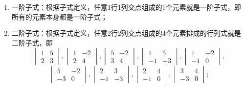 \begin{solution}
    \begin{enumerate}
        \item 一阶子式：根据子式定义，任意1行1列交点组成的1个元素就是一阶子式，即所有的元素本身都是一阶子式；

        \item 二阶子式：根据子式定义，任意2行2列交点组成的4个元素排成的行列式就是二阶子式，即
              \[\begin{vmatrix}
                      1 & 5 \\
                      2 & 3
                  \end{vmatrix},\begin{vmatrix}
                      1 & -2 \\
                      2 & 4
                  \end{vmatrix},\begin{vmatrix}
                      5 & -2 \\
                      3 & 4
                  \end{vmatrix},\begin{vmatrix}
                      1  & 5  \\
                      -1 & -3
                  \end{vmatrix},\begin{vmatrix}
                      1  & -2 \\
                      -1 & 0
                  \end{vmatrix},\]\[\begin{vmatrix}
                      5  & -2 \\
                      -3 & 0
                  \end{vmatrix},\begin{vmatrix}
                      2  & 3  \\
                      -1 & -3
                  \end{vmatrix},\begin{vmatrix}
                      2  & 4 \\
                      -1 & 0
                  \end{vmatrix},\begin{vmatrix}
                      3  & 4 \\
                      -3 & 0
                  \end{vmatrix};\]


\end{enumerate}
\end{solution}
